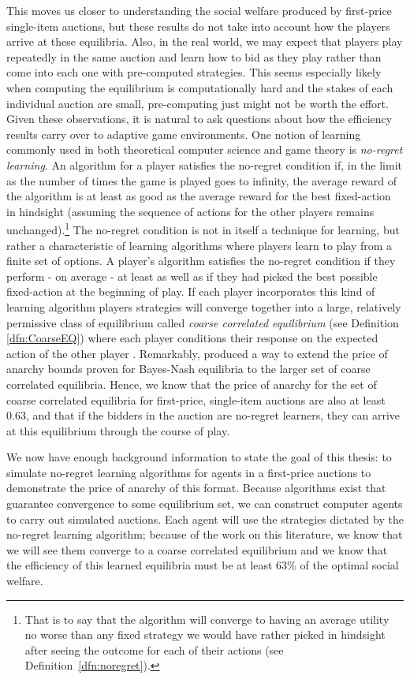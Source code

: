 \documentclass[12pt,twoside]{reedthesis}
\begin{document}
This moves us closer to understanding the social welfare produced by first-price single-item auctions, but these results do not take into account how the players arrive at these equilibria. Also, in the real world, we may expect that players play repeatedly in the same auction and learn how to bid as they play rather than come into each one with pre-computed strategies. This seems especially likely when computing the equilibrium is computationally hard and the stakes of each individual auction are small, pre-computing just might not be worth the effort. Given these observations, it is natural to ask questions about how the efficiency results carry over to adaptive game environments. One notion of learning commonly used in both theoretical computer science and game theory is {\em no-regret learning}. An algorithm for a player satisfies the no-regret condition if, in the limit as the number of times the game is played goes to infinity, the average reward of the algorithm is at least as good as the average reward for the best fixed-action in hindsight (assuming the sequence of actions for the other players remains unchanged).\footnote{That is to say that the algorithm will converge to having an average utility no worse than any fixed strategy we would have rather picked in hindsight after seeing the outcome for each of their actions (see Definition~\ref{dfn:noregret}).} The no-regret condition is not in itself a technique for learning, but rather a characteristic of learning algorithms where players learn to play from a finite set of options. A player's algorithm satisfies the no-regret condition if they perform - on average - at least as well as if they had picked the best possible fixed-action at the beginning of play. If each player incorporates this kind of learning algorithm players strategies will converge together into a large, relatively permissive class of equilibrium called {\em coarse correlated equilibrium} (see Definition \ref{dfn:CoarseEQ}) where each player conditions their response on the expected action of the other player \citep{Blum2007}. Remarkably, \cite{Roughgarden2017} produced a way to extend the price of anarchy bounds proven for Bayes-Nash equilibria to the larger set of coarse correlated equilibria. Hence, we know that the price of anarchy for the set of coarse correlated equilibria for first-price, single-item auctions are also at least 0.63, and that if the bidders in the auction are no-regret learners, they can arrive at this equilibrium through the course of play.

We now have enough background information to state the goal of this thesis: to simulate no-regret learning algorithms for agents in a first-price auctions to demonstrate the price of anarchy of this format. Because algorithms exist that guarantee convergence to some equilibrium set, we can construct computer agents to carry out simulated auctions. Each agent will use the strategies dictated by the no-regret learning algorithm; because of the work on this literature, we know that we will see them converge to a coarse correlated equilibrium and we know that the efficiency of this learned equilibria must be at least 63\% of the optimal social welfare.
\end{document}
